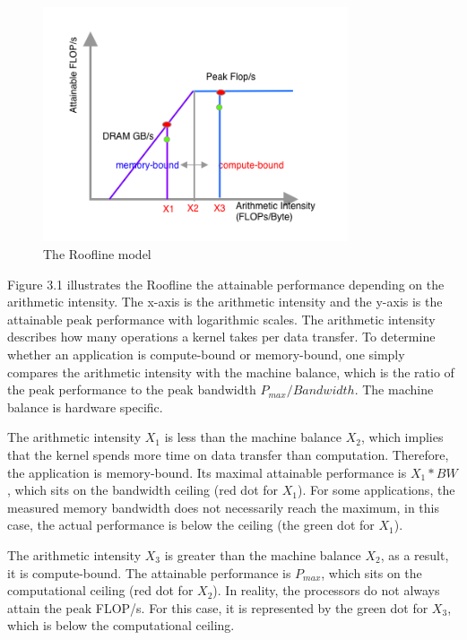 \begin{figure} [h] %
	\centering   %
	\includegraphics[width=9cm]{pictures/fig3.2}
	\caption{The Roofline model}
	\label{fig3.2}  %
\end{figure}

Figure 3.1 illustrates the Roofline the attainable performance depending on the arithmetic intensity. The x-axis is the arithmetic intensity and the y-axis is the attainable peak performance with logarithmic scales. The arithmetic intensity describes how many operations a kernel takes per data transfer. To determine whether an application is compute-bound or memory-bound, one simply compares the arithmetic intensity with the machine balance, which is the ratio of the peak performance to the peak bandwidth $P_{max}/Bandwidth$. The machine balance is hardware specific.

The arithmetic intensity $X_1$ is less than the machine balance $X_2$, which implies that the kernel spends more time on data transfer than computation. Therefore, the application is memory-bound. Its maximal attainable performance is $X_1 * BW$, which sits on the bandwidth ceiling (red dot for $X_1$). For some applications, the measured memory bandwidth does not necessarily reach the maximum, in this case, the actual performance is below the ceiling (the green dot for $X_1$). 

The arithmetic intensity $X_3$ is greater than the machine balance $X_2$, as a result, it is compute-bound. The attainable performance is $P_{max}$, which sits on the computational ceiling (red dot for $X_2$). In reality, the processors do not always attain the peak FLOP/s. For this case, it is represented by the green dot for $X_3$, which is below the computational ceiling.

